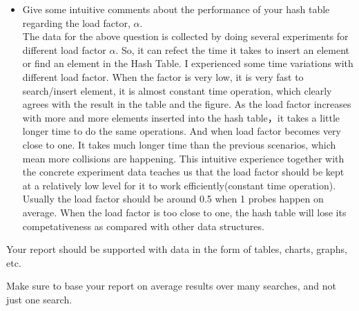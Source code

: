 \documentclass{article}
\begin{document}
\begin{itemize}
\item Give some intuitive comments about the performance of your hash table
  regarding the load factor, $\alpha$.\\

  The data for the above question is collected by doing several
  experiments for different load factor $\alpha$. So, it can refect the
  time it takes to insert an element or find an element in the Hash
  Table. I experienced some time variations with different load
  factor. When the factor is very low, it is very fast to search/insert
  element, it is almost constant time operation, which clearly agrees
  with the result in the table and the figure. As the load factor
  increases with more and more elements inserted into the hash table，it
  takes a little longer time to do the same operations. And when load
  factor becomes very close to one. It takes much longer time than the
  previous scenarios, which mean more collisions are happening. This
  intuitive experience together with the concrete experiment data
  teaches us that the load factor should be kept at a relatively low
  level for it to work efficiently(constant time operation). Usually the
  load factor should be around 0.5 when 1 probes happen on average. When
  the load factor is too close to one, the hash table will lose its
  competativeness as compared with other data structures.
\end{itemize}

Your report should be supported with data in the form of tables,
charts, graphs, etc. 

Make sure to base your report on average results over many searches,
and not just one search. 
\end{document}
